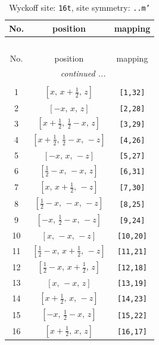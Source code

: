 \documentclass[fleqn,8pt]{jsarticle}
\begin{document}
\renewcommand{\arraystretch}{1.2}
\begin{longtable}{ccc}
\caption{Wyckoff site: {\tt 16t}, site symmetry: {\tt ..m'}}
 \\
 \hline \hline
No. & position & mapping \\ \hline \endfirsthead

\multicolumn{2}{l}{\tablename\ \thetable{}} \\
 \hline \hline
No. & position & mapping \\ \hline \endhead

 \hline \hline
\multicolumn{2}{r}{\footnotesize\it continued ...} \\ \endfoot

 \hline \hline
\multicolumn{2}{r}{} \\ \endlastfoot

1 & $\left[ x,\, x + \frac{1}{2},\, z \right]$ & {\tt [1,32]} \\ \hline
2 & $\left[ - x,\, x,\, z \right]$ & {\tt [2,28]} \\ \hline
3 & $\left[ x + \frac{1}{2},\, \frac{1}{2} - x,\, z \right]$ & {\tt [3,29]} \\ \hline
4 & $\left[ x + \frac{1}{2},\, \frac{1}{2} - x,\, - z \right]$ & {\tt [4,26]} \\ \hline
5 & $\left[ - x,\, x,\, - z \right]$ & {\tt [5,27]} \\ \hline
6 & $\left[ \frac{1}{2} - x,\, - x,\, z \right]$ & {\tt [6,31]} \\ \hline
7 & $\left[ x,\, x + \frac{1}{2},\, - z \right]$ & {\tt [7,30]} \\ \hline
8 & $\left[ \frac{1}{2} - x,\, - x,\, - z \right]$ & {\tt [8,25]} \\ \hline
9 & $\left[ - x,\, \frac{1}{2} - x,\, - z \right]$ & {\tt [9,24]} \\ \hline
10 & $\left[ x,\, - x,\, - z \right]$ & {\tt [10,20]} \\ \hline
11 & $\left[ \frac{1}{2} - x,\, x + \frac{1}{2},\, - z \right]$ & {\tt [11,21]} \\ \hline
12 & $\left[ \frac{1}{2} - x,\, x + \frac{1}{2},\, z \right]$ & {\tt [12,18]} \\ \hline
13 & $\left[ x,\, - x,\, z \right]$ & {\tt [13,19]} \\ \hline
14 & $\left[ x + \frac{1}{2},\, x,\, - z \right]$ & {\tt [14,23]} \\ \hline
15 & $\left[ - x,\, \frac{1}{2} - x,\, z \right]$ & {\tt [15,22]} \\ \hline
16 & $\left[ x + \frac{1}{2},\, x,\, z \right]$ & {\tt [16,17]} \\
\end{longtable}
\end{document}
